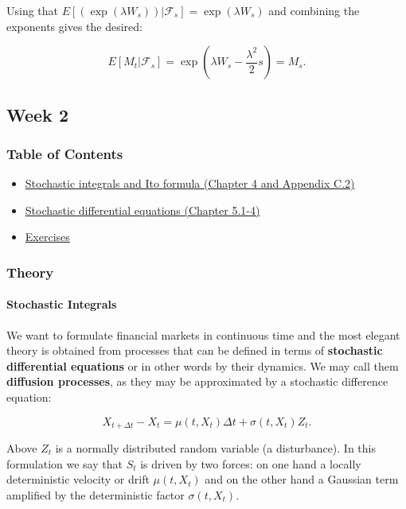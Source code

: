 \documentclass[
]{article}
\begin{document}
Using that
\(E\left.\left[\left(\exp\left(\lambda W_s\right)\right)\right\vert\mathcal{F}_s\right]=\exp\left(\lambda W_s\right)\)
and combining the exponents gives the desired:

\[E[M_t\vert\mathcal{F}_s]=\exp\left(\lambda W_s-\frac{\lambda^2}{2}s\right)=M_s.\]

\hypertarget{week-2}{%
\subsection{Week 2}\label{week-2}}

\hypertarget{table-of-contents-1}{%
\subsubsection{Table of Contents}\label{table-of-contents-1}}

\begin{itemize}
\item
  \protect\hyperlink{stochastic-integrals}{Stochastic integrals and Ito
  formula (Chapter 4 and Appendix C.2)}
\item
  \protect\hyperlink{stochastic-differential-equations}{Stochastic
  differential equations (Chapter 5.1-4)}
\item
  \protect\hyperlink{exercises-week-2}{Exercises}
\end{itemize}

\hypertarget{theory-1}{%
\subsubsection{Theory}\label{theory-1}}

\hypertarget{stochastic-integrals}{%
\paragraph{Stochastic Integrals}\label{stochastic-integrals}}

We want to formulate financial markets in continuous time and the most
elegant theory is obtained from processes that can be defined in terms
of \textbf{stochastic differential equations} or in other words by their
dynamics. We may call them \textbf{diffusion processes}, as they may be
approximated by a stochastic difference equation:

\[
X_{t+\Delta t}-X_t=\mu(t,X_t)\Delta t+\sigma(t,X_t)Z_t.\tag{4.1}
\]

Above \(Z_t\) is a normally distributed random variable (a disturbance).
In this formulation we say that \(S_t\) is driven by two forces: on one
hand a locally deterministic velocity or drift \(\mu(t,X_t)\) and on the
other hand a Gaussian term amplified by the deterministic factor
\(\sigma(t,X_t)\).
\end{document}
